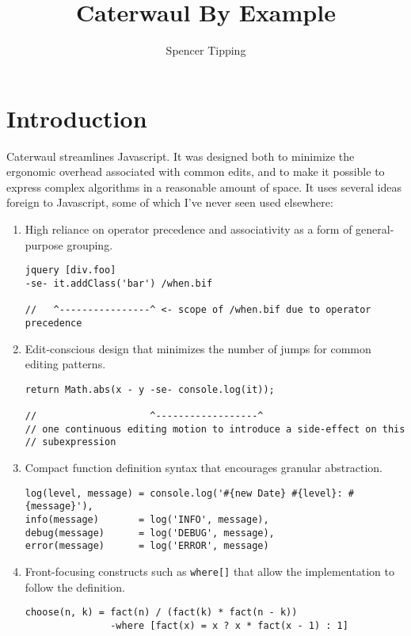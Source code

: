 \documentclass{report}
\title{Caterwaul By Example}
\author{Spencer Tipping}
\begin{document}
\maketitle{}
\tableofcontents{}

\chapter{Introduction}\label{sec:introduction}
  Caterwaul streamlines Javascript. It was designed both to minimize the ergonomic overhead associated with common edits, and to make it possible to express complex algorithms in a reasonable
  amount of space. It uses several ideas foreign to Javascript, some of which I've never seen used elsewhere:

\begin{enumerate}
\item{High reliance on operator precedence and associativity as a form of general-purpose grouping.}
\begin{verbatim}
jquery [div.foo]
-se- it.addClass('bar') /when.bif

//   ^----------------^ <- scope of /when.bif due to operator precedence
\end{verbatim}

\item{Edit-conscious design that minimizes the number of jumps for common editing patterns.}
\begin{verbatim}
return Math.abs(x - y -se- console.log(it));

//                    ^------------------^
// one continuous editing motion to introduce a side-effect on this
// subexpression
\end{verbatim}

\item{Compact function definition syntax that encourages granular abstraction.}
\begin{verbatim}
log(level, message) = console.log('#{new Date} #{level}: #{message}'),
info(message)       = log('INFO', message),
debug(message)      = log('DEBUG', message),
error(message)      = log('ERROR', message)
\end{verbatim}

\item{Front-focusing constructs such as {\tt where[]} that allow the implementation to follow the definition.}
\begin{verbatim}
choose(n, k) = fact(n) / (fact(k) * fact(n - k))
               -where [fact(x) = x ? x * fact(x - 1) : 1]
\end{verbatim}
\end{enumerate}
\end{document}
